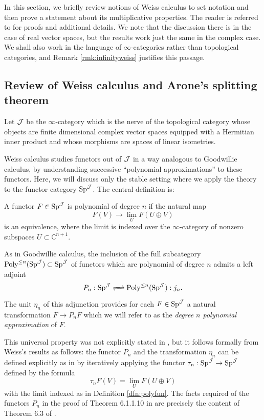 

In this section, we briefly review notions of Weiss calculus to set notation and then prove a statement about its multiplicative properties.  The reader is referred to \cite{Weiss} for proofs and additional details.  We note that the discussion there is in the case of real vector spaces, but the results work just the same in the complex case.  We shall also work in the language of $\infty$-categories rather than topological categories, and Remark \ref{rmk:infinityweiss} justifies this passage.  

\subsection{Review of Weiss calculus and Arone's splitting theorem}
Let $\operatorname{\mathcal{J}}$ be the $\infty$-category which is the nerve of the topological category whose objects are finite dimensional complex vector spaces equipped with a Hermitian inner product and whose morphisms are spaces of linear isometries.  

Weiss calculus studies functors out of $\operatorname{\mathcal{J}}$ in a way analogous to Goodwillie calculus, by understanding successive ``polynomial approximations'' to these functors.  Here, we will discuss only the stable setting where we apply the theory to the functor category $\operatorname{\text{Sp}}^{\operatorname{\mathcal{J}}}$. The central definition is:

\begin{dfn}\label{dfn:polyfun}
A functor $F\in \operatorname{\text{Sp}}^{\operatorname{\mathcal{J}}}$ is polynomial of degree $n$ if the natural map $$F(V) \to \lim_U F(U\oplus V)$$ is an equivalence, where the limit is indexed over the $\infty$-category of nonzero subspaces $U\subset \mathbb{C}^{n+1}.$
\end{dfn}

As in Goodwillie calculus, the inclusion of the full subcategory $\operatorname{\text{Poly}}^{\leq n}(\operatorname{\text{Sp}}^{\operatorname{\mathcal{J}}}) \subset \operatorname{\text{Sp}}^{\operatorname{\mathcal{J}}}$ of functors which are polynomial of degree $n$ admits a left adjoint $$P_n: \Sp^{\J} \xrightleftharpoons{\quad} \Poly^{\leq n}(\Sp^{\J}): j_n.$$ %
 The unit $\eta_n$ of this adjunction provides for each $F\in \operatorname{\text{Sp}}^{\operatorname{\mathcal{J}}}$ a natural transformation $F \to P_nF$ which we will refer to as the \emph{degree $n$ polynomial approximation} of $F$. 

\begin{rmk}\label{rmk:infinityweiss}
This universal property was not explicitly stated in \cite{Weiss}, but it follows formally from Weiss's results as follows: the functor $P_n$ and the transformation $\eta_n$ can be defined explicitly as in \cite{Weiss} by iteratively applying the functor $\tau_n: \operatorname{\text{Sp}}^{\operatorname{\mathcal{J}}} \to \operatorname{\text{Sp}}^{\operatorname{\mathcal{J}}}$ defined by the formula $$\tau_n F(V) = \lim_U F(U\oplus V)$$ with the limit indexed as in Definition \ref{dfn:polyfun}.   The facts required of the functors $P_n$ in the proof of Theorem 6.1.1.10 in \cite{HA} are precisely the content of Theorem 6.3 of \cite{Weiss}.  
\end{rmk}

